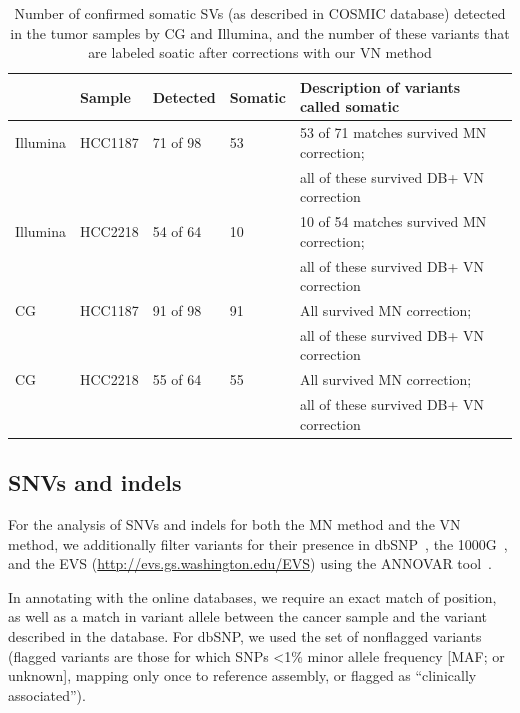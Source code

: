 \small
\begin{table}[t!]
\centering
\begin{tabular}{lllll}
          & Sample  & Detected & Somatic & Description of variants called somatic \\ \hline
Illumina  & HCC1187 & 71 of 98 & 53 & 53 of 71 matches survived MN correction; \\
          &         &          &    & all of these survived DB+ VN correction \\
Illumina  & HCC2218 & 54 of 64 & 10 & 10 of 54 matches survived MN correction;\\
          &         &          &    & all of these survived DB+ VN correction \\
CG        & HCC1187 & 91 of 98 & 91 & All survived MN correction; \\
          &         &          &    & all of these survived DB+ VN correction \\
CG        & HCC2218 & 55 of 64 & 55 & All survived MN correction; \\
          &         &          &    & all of these survived DB+ VN correction \\
\end{tabular}
\caption{Number of confirmed somatic SVs (as described in COSMIC database) detected in the tumor samples by CG and Illumina, and the number of these variants that are labeled soatic after corrections with our VN method}
\label{table:table1}
\end{table}
\normalsize

\subsection*{SNVs and indels}

For the analysis of SNVs and indels for both the MN method and the VN method, we additionally filter variants for their presence in dbSNP~\cite{sherry2001dbsnp}, the 1000G~\cite{10002010map,10002012integrated}, and the EVS (\url{http://evs.gs.washington.edu/EVS}) using the ANNOVAR tool~\cite{wang2010annovar}.

In annotating with the online databases, we require an exact match of position, as well as a match in variant allele between the cancer sample and the variant described in the database. For dbSNP, we used the set of nonflagged variants (flagged variants are those for which SNPs <1\% minor allele frequency [MAF; or unknown], mapping only once to reference assembly, or flagged as “clinically associated”).

